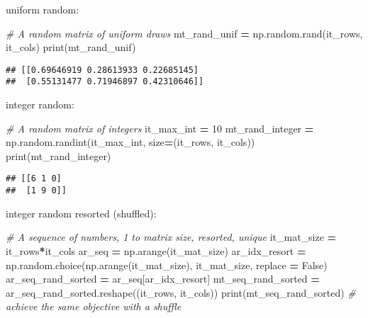 \documentclass[
]{book}
\newenvironment{Shaded}{\begin{snugshade}}{\end{snugshade}}
\newcommand{\BuiltInTok}[1]{#1}
\newcommand{\CommentTok}[1]{\textcolor[rgb]{0.56,0.35,0.01}{\textit{#1}}}
\newcommand{\DecValTok}[1]{\textcolor[rgb]{0.00,0.00,0.81}{#1}}
\newcommand{\NormalTok}[1]{#1}
\newcommand{\OperatorTok}[1]{\textcolor[rgb]{0.81,0.36,0.00}{\textbf{#1}}}
\newcommand{\VariableTok}[1]{\textcolor[rgb]{0.00,0.00,0.00}{#1}}
\begin{document}
uniform random:

\begin{Shaded}
\begin{Highlighting}[]
\CommentTok{\# A random matrix of uniform draws}
\NormalTok{mt\_rand\_unif }\OperatorTok{=}\NormalTok{ np.random.rand(it\_rows, it\_cols)}
\BuiltInTok{print}\NormalTok{(mt\_rand\_unif)}
\end{Highlighting}
\end{Shaded}

\begin{verbatim}
## [[0.69646919 0.28613933 0.22685145]
##  [0.55131477 0.71946897 0.42310646]]
\end{verbatim}

integer random:

\begin{Shaded}
\begin{Highlighting}[]
\CommentTok{\# A random matrix of integers}
\NormalTok{it\_max\_int }\OperatorTok{=} \DecValTok{10}
\NormalTok{mt\_rand\_integer }\OperatorTok{=}\NormalTok{ np.random.randint(it\_max\_int, size}\OperatorTok{=}\NormalTok{(it\_rows, it\_cols))}
\BuiltInTok{print}\NormalTok{(mt\_rand\_integer)}
\end{Highlighting}
\end{Shaded}

\begin{verbatim}
## [[6 1 0]
##  [1 9 0]]
\end{verbatim}

integer random resorted (shuffled):

\begin{Shaded}
\begin{Highlighting}[]
\CommentTok{\# A sequence of numbers, 1 to matrix size, resorted, unique}
\NormalTok{it\_mat\_size }\OperatorTok{=}\NormalTok{ it\_rows}\OperatorTok{*}\NormalTok{it\_cols}
\NormalTok{ar\_seq }\OperatorTok{=}\NormalTok{ np.arange(it\_mat\_size)}
\NormalTok{ar\_idx\_resort }\OperatorTok{=}\NormalTok{ np.random.choice(np.arange(it\_mat\_size), it\_mat\_size, replace }\OperatorTok{=} \VariableTok{False}\NormalTok{)}
\NormalTok{ar\_seq\_rand\_sorted }\OperatorTok{=}\NormalTok{ ar\_seq[ar\_idx\_resort]}
\NormalTok{mt\_seq\_rand\_sorted }\OperatorTok{=}\NormalTok{ ar\_seq\_rand\_sorted.reshape((it\_rows, it\_cols))}
\BuiltInTok{print}\NormalTok{(mt\_seq\_rand\_sorted)}
\CommentTok{\# achieve the same objective with a shuffle}
\end{Highlighting}
\end{Shaded}
\end{document}
